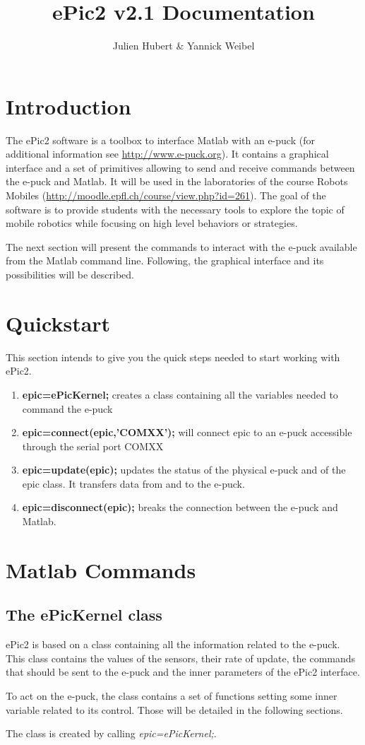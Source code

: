 \documentclass[11pt,oneside,english,a4paper]{article}
\begin{document}
\title{ePic2 v2.1 Documentation}
\author{Julien Hubert \& Yannick Weibel}
\maketitle
\section{Introduction}
The ePic2 software is a toolbox to interface Matlab with an e-puck (for additional information see \href{http://www.e-puck.org}{http://www.e-puck.org}). It contains a graphical interface and a set of primitives allowing to send and receive commands between the e-puck and Matlab. It will be used in the laboratories of the course Robots Mobiles (\href{http://moodle.epfl.ch/course/view.php?id=261}{http://moodle.epfl.ch/course/view.php?id=261}). The goal of the software is to provide students with the necessary tools to explore the topic of mobile robotics while focusing on high level behaviors or strategies.
\par The next section will present the commands to interact with the e-puck available from the Matlab command line. Following, the graphical interface and its possibilities will be described.

\section{Quickstart}
This section intends to give you the quick steps needed to start working with ePic2.
\begin{enumerate}
\item \textbf{epic=ePicKernel;} creates a class containing all the variables needed to command the e-puck
\item \textbf{epic=connect(epic,'COMXX');} will connect epic to an e-puck accessible through the serial port COMXX
\item \textbf{epic=update(epic);} updates the status of the physical e-puck and of the epic class. It transfers data from and to the e-puck. 
\item \textbf{epic=disconnect(epic);} breaks the connection between the e-puck and Matlab.

\end{enumerate}

\section{Matlab Commands}
\subsection{The ePicKernel class}
ePic2 is based on a class containing all the information related to the e-puck. This class contains the values of the sensors, their rate of update, the commands that should be sent to the e-puck and the inner parameters of the ePic2 interface.
\par To act on the e-puck, the class contains a set of functions setting some inner variable related to its control. Those will be detailed in the following sections.
\par The class is created by calling \emph{epic=ePicKernel;}.
\end{document}
